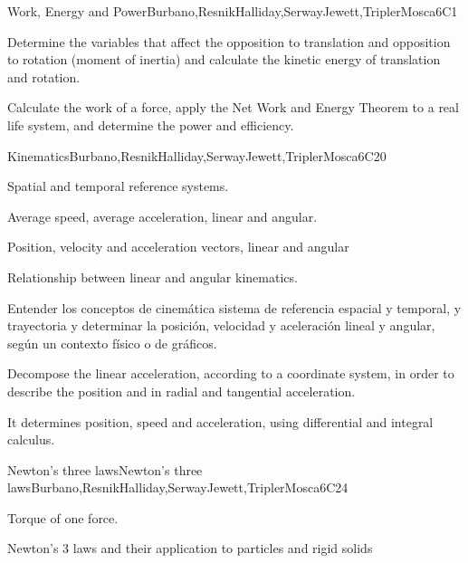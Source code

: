 \begin{syllabus}
\begin{unit}{Work, Energy and Power}{}{Burbano,ResnikHalliday,SerwayJewett,TriplerMosca}{6}{C1}
      \begin{learningoutcomes}
         \item Determine the variables that affect the opposition to translation and opposition to rotation (moment of inertia) and calculate the kinetic energy of translation and rotation.
         \item Calculate the work of a force, apply the Net Work and Energy Theorem to a real life system, and determine the power and efficiency.
      \end{learningoutcomes}
   \end{unit}
   
   \begin{unit}{}{Kinematics}{Burbano,ResnikHalliday,SerwayJewett,TriplerMosca}{6}{C20}
   \begin{topics}
         \item Spatial and temporal reference systems.
         \item Average speed, average acceleration, linear and angular.
         \item Position, velocity and acceleration vectors, linear and angular
         \item Relationship between linear and angular kinematics.
       \end{topics}
      \begin{learningoutcomes}
         \item Entender los conceptos de cinemática sistema de referencia espacial y temporal, y trayectoria y determinar la posición, velocidad y aceleración lineal y angular, según un contexto físico o de gráficos.
         \item Decompose the linear acceleration, according to a coordinate system, in order to describe the position and in radial and tangential acceleration.
         \item It determines position, speed and acceleration, using differential and integral calculus. 
      \end{learningoutcomes}
   \end{unit}
   
   \begin{unit}{Newton's three laws}{Newton's three laws}{Burbano,ResnikHalliday,SerwayJewett,TriplerMosca}{6}{C24}
   \begin{topics}
         \item Torque of one force.
         \item Newton's 3 laws and their application to particles and rigid solids
      \end{topics}
   

\end{unit}
\end{syllabus}
